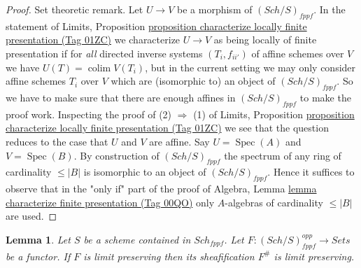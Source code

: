 \documentclass{amsart}
\theoremstyle{plain}
\newtheorem{lemma}[subsection]{Lemma}
\theoremstyle{definition}
\theoremstyle{remark}
\numberwithin{equation}{subsection}
\def\colim{\mathop{\mathrm{colim}}\nolimits}
\def\Spec{\mathop{\mathrm{Spec}}}
\def\Sch{\mathit{Sch}}
\begin{document}
\begin{proof}
\medskip\noindent
Set theoretic remark. Let $U \to V$ be a morphism of
$(\Sch/S)_{fppf}$. In the statement of
Limits, Proposition
\href{https://stacks.math.columbia.edu/tag/01ZC}{proposition characterize locally finite presentation (Tag 01ZC)}
we characterize $U \to V$ as being locally of finite presentation
if for {\it all} directed inverse systems $(T_i, f_{ii'})$ of affine schemes
over $V$ we have $U(T) = \colim V(T_i)$, but in the current setting
we may only consider affine schemes $T_i$ over $V$ which are (isomorphic to)
an object of $(\Sch/S)_{fppf}$. So we have to make sure that there
are enough affines in $(\Sch/S)_{fppf}$ to make the proof work.
Inspecting the proof of (2) $\Rightarrow$ (1) of
Limits, Proposition
\href{https://stacks.math.columbia.edu/tag/01ZC}{proposition characterize locally finite presentation (Tag 01ZC)}
we see that the question reduces to the case that $U$ and $V$ are affine.
Say $U = \Spec(A)$ and $V = \Spec(B)$. By construction
of $(\Sch/S)_{fppf}$ the spectrum of any ring of cardinality
$\leq |B|$ is isomorphic to an object of $(\Sch/S)_{fppf}$.
Hence it suffices to observe that in the "only if" part of the proof of
Algebra, Lemma \href{https://stacks.math.columbia.edu/tag/00QO}{lemma characterize finite presentation (Tag 00QO)}
only $A$-algebras of cardinality $\leq |B|$ are used.
\end{proof}


\begin{lemma}
\label{lemma-sheafify-finite-presentation}
Let $S$ be a scheme contained in $\Sch_{fppf}$.
Let $F : (\Sch/S)_{fppf}^{opp} \to \textit{Sets}$ be a functor.
If $F$ is limit preserving then its sheafification $F^\#$ is limit preserving.
\end{lemma}
\end{document}
